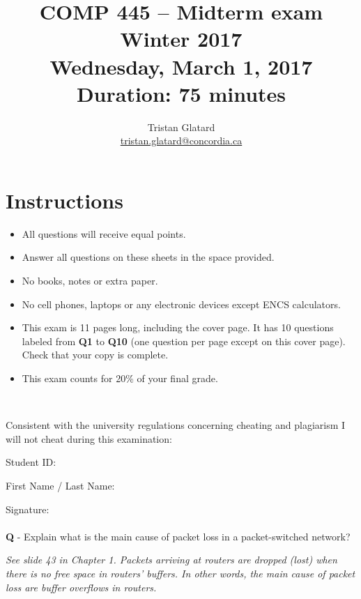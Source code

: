 \documentclass{llncs}
\title{COMP 445 -- Midterm exam \\ Winter 2017 \\ Wednesday, March 1, 2017 \\ Duration: 75 minutes}
\author{Tristan Glatard\\
  \href{mailto:tristan.glatard@concordia.ca}{tristan.glatard@concordia.ca}\\
  \vspace*{0.3cm}
  }
\institute{Concordia University\\
  Department of Computer Science and Software Engineering}
\newcounter{ques}
\newcommand{\myspace}[0]{\vspace*{0.25cm}}
\renewcommand{\question}[1]{\paragraph{}\textbf{Q\theques} - #1\stepcounter{ques} }
\newcommand{\answer}[1]{\color{red}\textit{#1}\color{black}}
\begin{document}
\maketitle

\section*{Instructions}
\begin{itemize}
\item All questions will receive equal points.
\item Answer all questions on these sheets in the space provided.
\item No books, notes or extra paper.
\item No cell phones, laptops or any electronic devices except ENCS calculators.
\item This exam is 11 pages long, including the cover page. It has 10 questions labeled from \textbf{Q1} to \textbf{Q10} (one question per page except on this cover page). Check that your copy is complete.
\item This exam counts for 20\% of your final grade.
\end{itemize}

\myspace

\myspace

\hrulefill\\

\myspace

Consistent with the university regulations concerning cheating and plagiarism I will not cheat during this examination:

\myspace

\myspace

Student ID: \dotfill

\myspace

\myspace

First Name / Last Name: \dotfill

\myspace

\myspace

Signature: \dotfill

\myspace

\myspace

\hrulefill

\newpage


\question{Explain what is the main cause of packet loss in a packet-switched network?}

\answer{See slide 43 in Chapter 1. Packets arriving at routers are
  dropped (lost) when there is no free space in routers' buffers. In
  other words, the main cause of packet loss are buffer overflows in
  routers.}
\end{document}

